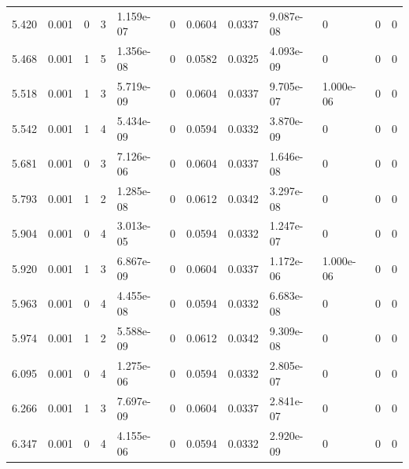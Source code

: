 \documentclass[preview]{standalone}
\begin{document}
{{\begin{tabular}{L{1.2cm}C{1.2cm} C{0.3cm}C{0.5cm} C{1.4cm}C{1.4cm} C{1.4cm}C{1.4cm} C{1.6cm}C{1.6cm} C{1.6cm}C{1.6cm}}
  5.420  &  0.001  & 0     &  3 &  1.159e-07  & 0  &  0.0604&   0.0337& 9.087e-08 & 0   &  0 & 0  \\ 
  5.468  &  0.001  & 1     &  5 &  1.356e-08  & 0  &  0.0582&   0.0325& 4.093e-09 & 0   &  0 & 0  \\ 
  5.518  &  0.001  & 1     &  3 &  5.719e-09  & 0  &  0.0604&   0.0337& 9.705e-07 & 1.000e-06   &  0 & 0  \\ 
  5.542  &  0.001  & 1     &  4 &  5.434e-09  & 0  &  0.0594&   0.0332& 3.870e-09 & 0   &  0 & 0  \\ 
  5.681  &  0.001  & 0     &  3 &  7.126e-06  & 0  &  0.0604&   0.0337& 1.646e-08 & 0   &  0 & 0  \\ 
  5.793  &  0.001  & 1     &  2 &  1.285e-08  & 0  &  0.0612&   0.0342& 3.297e-08 & 0   &  0 & 0  \\ 
  5.904  &  0.001  & 0     &  4 &  3.013e-05  & 0  &  0.0594&   0.0332& 1.247e-07 & 0   &  0 & 0  \\ 
  5.920  &  0.001  & 1     &  3 &  6.867e-09  & 0  &  0.0604&   0.0337& 1.172e-06 & 1.000e-06   &  0 & 0  \\ 
  5.963  &  0.001  & 0     &  4 &  4.455e-08  & 0  &  0.0594&   0.0332& 6.683e-08 & 0   &  0 & 0  \\ 
  5.974  &  0.001  & 1     &  2 &  5.588e-09  & 0  &  0.0612&   0.0342& 9.309e-08 & 0   &  0 & 0  \\ 
  6.095  &  0.001  & 0     &  4 &  1.275e-06  & 0  &  0.0594&   0.0332& 2.805e-07 & 0   &  0 & 0  \\ 
  6.266  &  0.001  & 1     &  3 &  7.697e-09  & 0  &  0.0604&   0.0337& 2.841e-07 & 0   &  0 & 0  \\ 
  6.347  &  0.001  & 0     &  4 &  4.155e-06  & 0  &  0.0594&   0.0332& 2.920e-09 & 0   &  0 & 0  \\ 
\hline 
\end{tabular} 

}}
\end{document}
